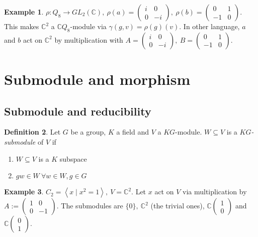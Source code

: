 \documentclass[a4paper]{article}
\newcommand{\la}{\left\langle}
\newcommand{\ra}{\right\rangle}
\newcommand{\C}{\mathbb{C}}
\theoremstyle{definition}
\newtheorem{defn}{Definition}[subsection]
\newtheorem{example}[defn]{Example}
\begin{document}
\begin{example}
$\rho:Q_8\rightarrow GL_2(\C),\ \rho(a)=\begin{pmatrix}i&0\\0&-i\end{pmatrix},\ \rho(b)=\begin{pmatrix}0&1\\-1&0\end{pmatrix}$. This makes $\C^2$ a $\C Q_8$-module via $\gamma(g,v)=\rho(g)(v)$. In other language, $a$ and $b$ act on $\C^2$ by multiplication with $A=\begin{pmatrix}i&0\\0&-i\end{pmatrix},\ B=\begin{pmatrix}0&1\\-1&0\end{pmatrix}$.
\end{example}

\section{Submodule and morphism}
\subsection{Submodule and reducibility}
\begin{defn}
Let $G$ be a group, $K$ a field and $V$ a $KG$-module. $W\subseteq V$ is a $KG$\textit{-submodule} of $V$ if
\begin{enumerate}
\item $W\subseteq V$ is a $K$ subspace
\item $gw\in W \ \forall w\in W, g\in G$
\end{enumerate}
\end{defn}

\begin{example}
$C_2=\la x\mid x^2=1\ra,\ V=\C^2$. Let $x$ act on $V$ via multiplication by $A:=\begin{pmatrix}1&0\\0&-1\end{pmatrix}$. The submodules are $\{0\},\ \C^2$ (the trivial ones), $\C\begin{pmatrix}1\\0\end{pmatrix}$ and  $\C\begin{pmatrix}0\\1\end{pmatrix}$.
\end{example}
\end{document}
